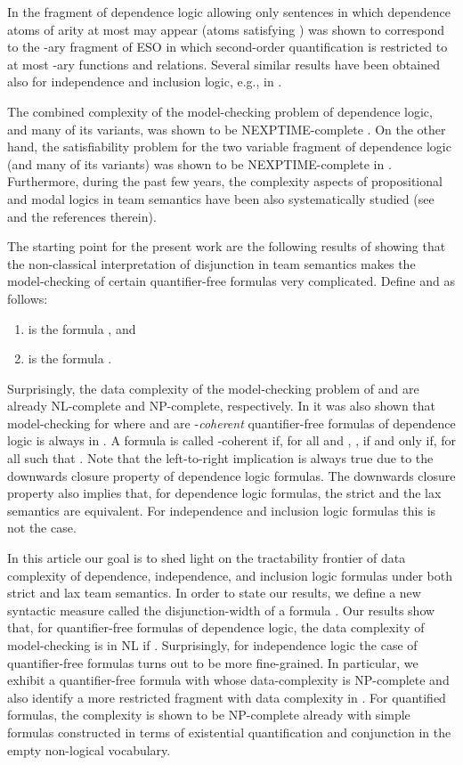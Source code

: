 \documentclass{article}
\theoremstyle{plain}
\theoremstyle{definition}
\begin{document}
 In \cite{durand11} the fragment of dependence logic allowing only sentences in which dependence atoms of arity at most  may appear (atoms   satisfying ) was shown to correspond to the -ary fragment   of ESO in which second-order quantification is restricted to at most -ary functions and relations.  
Several  similar results have been obtained  also for independence and inclusion logic, e.g.,  in \cite{galhankon13,DBLP:journals/corr/HannulaK14,Ronnholm18,Ronnholm19}.

 The combined complexity of the model-checking problem of dependence logic, and many of its variants, was shown to be NEXPTIME-complete \cite{gradel12}. On the other hand, the satisfiability problem for the two variable fragment of dependence logic (and many of its variants) was shown to be NEXPTIME-complete in \cite{KontinenKLV11, KontinenKV14}. Furthermore,  during the past few years, the complexity aspects of propositional and modal logics in team semantics have been also systematically studied (see \cite{Luck19,HannulaKVV18} and the references therein). 


The starting point for the present work are the following results of \cite{kontinenj13} showing that the non-classical interpretation of disjunction in team semantics makes the model-checking of certain quantifier-free
formulas very complicated.  Define  and  as follows:
\begin{enumerate}
\item  is the formula , and
\item\label{phi2}  is  the formula .
\end{enumerate}
Surprisingly, the data complexity of the model-checking problem of  and    are already  NL-complete and NP-complete, respectively. In  \cite{kontinenj13} it was also shown that  model-checking for  where  and  are -\emph{coherent} quantifier-free formulas of dependence logic is always in . A formula  is  called -coherent if, for all  and ,  , if and only if,   
 for all  such that . Note that the left-to-right implication is always true due to the downwards closure property of dependence logic formulas. The  downwards closure property also implies that, for dependence logic formulas,  the strict and the lax semantics are equivalent. For independence and inclusion logic formulas this is not the case.


In this article our goal is to shed light on  the tractability frontier of data complexity of dependence, independence, and inclusion logic  formulas under both strict and lax team semantics.  In order to state our results, we define  a new syntactic measure called the disjunction-width   of a formula . Our results show that,  for quantifier-free formulas  of dependence logic, the data complexity of model-checking is in NL if . Surprisingly, for independence logic the case of quantifier-free formulas turns out to be  more fine-grained. In particular, we exhibit  a quantifier-free formula  with  whose data-complexity is NP-complete and also identify a more restricted fragment with data complexity in  .
For quantified formulas,  the complexity 
is shown to be   NP-complete already with simple formulas constructed in terms of existential quantification and conjunction   in the empty non-logical vocabulary. 
\end{document}
